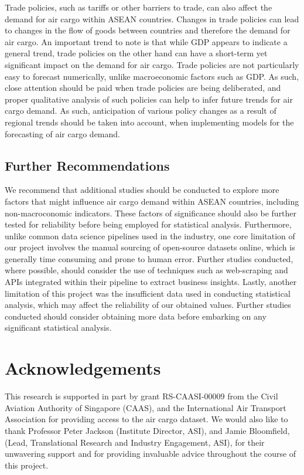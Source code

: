 \documentclass{article}
\begin{document}
\noindent Trade policies, such as tariffs or other barriers to trade, can also affect the demand for air cargo within ASEAN countries. Changes in trade policies can lead to changes in the flow of goods between countries and therefore the demand for air cargo. An important trend to note is that while GDP appears to indicate a general trend, trade policies on the other hand can have a short-term yet significant impact on the demand for air cargo. Trade policies are not particularly easy to forecast numerically, unlike macroeconomic factors such as GDP. As such, close attention should be paid when trade policies are being deliberated, and proper qualitative analysis of such policies can help to infer future trends for air cargo demand. As such, anticipation of various policy changes as a result of regional trends should be taken into account, when implementing models for the forecasting of air cargo demand.

\subsection{Further Recommendations}
We recommend that additional studies should be conducted to explore more factors that might influence air cargo demand within ASEAN countries, including non-macroconomic indicators. These factors of significance should also be further tested for reliability before being employed for statistical analysis. Furthermore, unlike common data science pipelines used in the industry, one core limitation of our project involves the manual sourcing of open-source datasets online, which is generally time consuming and prone to human error. Further studies conducted, where possible, should consider the use of techniques such as web-scraping and APIs integrated within their pipeline to extract business insights. Lastly, another limitation of this project was the insufficient data used in conducting statistical analysis, which may affect the reliability of our obtained values. Further studies conducted should consider obtaining more data before embarking on any significant statistical analysis. 

\section*{Acknowledgements}
This research is supported in part by grant RS-CAASI-00009 from the Civil Aviation Authority of Singapore (CAAS), and the International Air Transport Association for providing access to the air cargo dataset. We would also like to thank Professor Peter Jackson (Institute Director, ASI), and Jamie Bloomfield, (Lead, Translational Research and Industry Engagement, ASI), for their unwavering support and for providing invaluable advice throughout the course of this project. 



\end{document}
